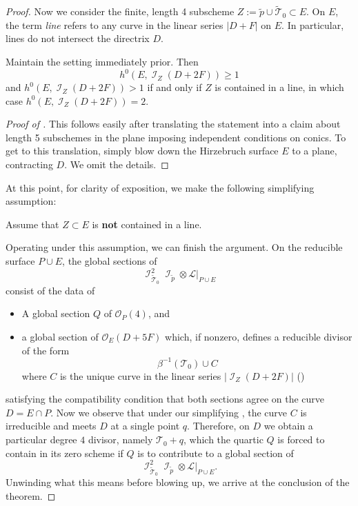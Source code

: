 \documentclass{article}
\DeclareMathOperator{\I}{\mathcal{I}}
\renewcommand{\O}{\mathcal{O}}
\begin{document}
\begin{proof}
Now we consider the finite, length 4 subscheme $Z := \widetilde{p} \cup \widetilde{\mathcal{T}}_{0} \subset E$.  On $E$, the term {\sl line} refers to any  curve in the linear series $|D+F|$ on $E$.  In particular, lines do not intersect the directrix $D$. 


\begin{lemma}
    \label{lemma:D2F} Maintain the setting immediately prior. Then $$h^{0}(E,\I_{Z}(D+2F)) \geq 1$$ and $h^{0}(E,\I_{Z}(D+2F)) > 1$ if and only if $Z$ is contained in a line, in which case $h^{0}(E,\I_{Z}(D+2F)) = 2$.
\end{lemma}

\begin{proof}[Proof of ]
    This follows easily after translating the statement into a claim about length 5 subschemes in the plane imposing independent conditions on conics.  To get to this translation, simply blow down the Hirzebruch surface $E$ to a plane, contracting $D$.  We omit the details.
\end{proof}

At this point, for clarity of exposition, we make the following simplifying assumption:

\begin{assumption}
\label{assumption:Noline}
    Assume that $Z \subset E$ is {\bf not} contained in a line.
\end{assumption}
Operating under this assumption, we can finish the argument. On the reducible surface $P \cup E$, the global sections of 
$$\I_{\widetilde{\mathcal{T}}_{0}}^{2}\I_{\widetilde{p}}\otimes \mathcal{L}|_{P \cup E}$$ consist of the data of
\begin{itemize}
    \item A global section $Q$ of $\O_{P}(4)$, and
    \item a global section of $\O_{E}(D+5F)$ which, if nonzero, defines a reducible divisor of the form \[\beta^{-1}(\mathcal{T}_{0}) \cup C\] where $C$ is the unique curve in the linear series $|\I_{Z}(D+2F)|$ ()
\end{itemize}
satisfying the compatibility condition that both sections agree on the curve $D = E \cap P$.  Now we observe that under our simplifying , the curve $C$ is irreducible and meets $D$ at a single point $q$.  Therefore, on $D$ we obtain a particular degree $4$ divisor, namely $\mathcal{T}_{0} + q$, which the quartic $Q$ is forced to contain in its zero scheme if $Q$ is to contribute to a global section of  $$\I_{\widetilde{\mathcal{T}}_{0}}^{2}\I_{\widetilde{p}}\otimes \mathcal{L}|_{P \cup E}.$$ Unwinding what this means before blowing up, we arrive at the conclusion of the theorem.


\end{proof}
\end{document}
